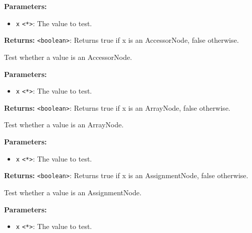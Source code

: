 \documentclass[12pt,a4paper]{article}
\begin{document}
\noindent \textbf{Parameters:}
\begin{itemize}
  \item \texttt{x} \texttt{<*>}: The value to test.
\end{itemize}

\noindent \textbf{Returns:} \texttt{<boolean>}: Returns true if \textasciigrave{}x\textasciigrave{} is an AccessorNode, false otherwise.

\noindent Test whether a value is an AccessorNode.

\vspace{5mm}
\noindent {}


\noindent \textbf{Parameters:}
\begin{itemize}
  \item \texttt{x} \texttt{<*>}: The value to test.
\end{itemize}

\noindent \textbf{Returns:} \texttt{<boolean>}: Returns true if \textasciigrave{}x\textasciigrave{} is an ArrayNode, false otherwise.

\noindent Test whether a value is an ArrayNode.

\vspace{5mm}
\noindent {}


\noindent \textbf{Parameters:}
\begin{itemize}
  \item \texttt{x} \texttt{<*>}: The value to test.
\end{itemize}

\noindent \textbf{Returns:} \texttt{<boolean>}: Returns true if \textasciigrave{}x\textasciigrave{} is an AssignmentNode, false otherwise.

\noindent Test whether a value is an AssignmentNode.

\vspace{5mm}
\noindent {}


\noindent \textbf{Parameters:}
\begin{itemize}
  \item \texttt{x} \texttt{<*>}: The value to test.
\end{itemize}
\end{document}
